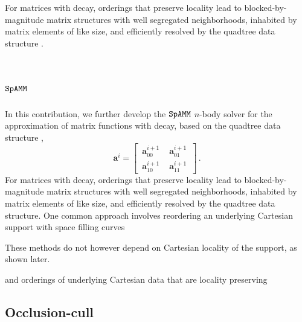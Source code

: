 \documentclass[letterpaper,twocolumn,amsmath,amsfont,amssymb,english,aps,jcp,preprintnumbers,groupaddress,nofootinbib,tightenlines,floatfix]{revtex4}
\newcommand{\mat}[1]{\boldsymbol{#1}}
\theoremstyle{plain}
\theoremstyle{remark}
\theoremstyle{plain}
\begin{document}
\tableofcontents
For matrices with decay, orderings that preserve locality lead to blocked-by-magnitude
matrix structures with well segregated neighborhoods, inhabited by
matrix elements of like size, and efficiently resolved by the quadtree
data structure \cite{}.
\section{$\tt SpAMM$}

In this contribution, we further develop the $\tt SpAMM$ $n$-body solver for the
approximation of matrix functions with decay, based on the quadtree data structure 
\cite{Samet:1990:DAS:77589,Samet:2006:DBDS,springerlink:10.1007/3-540-51084-2_9,Adams:2006:SOS},
\begin{equation}
\mat{a}^i = \begin{bmatrix} \,  \mat{a}^{i+1}_{00} \, & \,  \mat{a}^{i+1}_{01} \,  
\\[0.2cm]  \, \mat{a}^{i+1}_{10} \,  & \,\mat{a}^{i+1}_{11} \, \end{bmatrix} \, .
\end{equation}
For matrices with decay, orderings that preserve locality lead to blocked-by-magnitude
matrix structures with well segregated neighborhoods, inhabited by
matrix elements of like size, and efficiently resolved by the quadtree
data structure.  One common approach involves reordering an underlying Cartesian support  
with space filling curves \cite{Aluru:1997:SFC,Bader:2006:SFC,Campbell:2003:SFC,Devine:2005:SFC,Lashuk:2009:SFC}



These methods do not however depend on Cartesian locality of the support, as shown later. 

and orderings of underlying Cartesian data that are locality preserving 





\subsection{Occlusion-cull }
\end{document}

